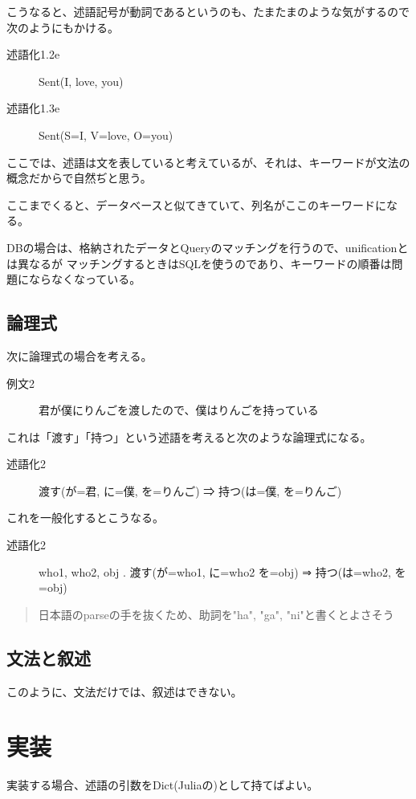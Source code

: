 \documentclass[10pt, oneside]{jarticle}   	%
\begin{document}
こうなると、述語記号が動詞であるというのも、たまたまのような気がするので次のようにもかける。

\begin{description}
\item[ 述語化1.2e] Sent(I, love, you)
\item[ 述語化1.3e] Sent(S=I, V=love, O=you)
\end{description}
ここでは、述語は文を表していると考えているが、それは、キーワードが文法の概念だからで自然ぢと思う。

ここまでくると、データベースと似てきていて、列名がここのキーワードになる。

DBの場合は、格納されたデータとQueryのマッチングを行うので、unificationとは異なるが
マッチングするときはSQLを使うのであり、キーワードの順番は問題にならなくなっている。



\subsection{論理式}
次に論理式の場合を考える。
\begin{description}
\item[ 例文2] 君が僕にりんごを渡したので、僕はりんごを持っている
\end{description}
これは「渡す」「持つ」という述語を考えると次のような論理式になる。
\begin{description}
\item[ 述語化2] 渡す(が=君, に=僕, を=りんご) ⇒ 持つ(は=僕, を=りんご)
\end{description}

これを一般化するとこうなる。
\begin{description}
\item[ 述語化2] who1, who2, obj . 渡す(が=who1, に=who2 を=obj) ⇒ 持つ(は=who2, を=obj)
\end{description}

\begin{quotation}
日本語のparseの手を抜くため、助詞を"ha", "ga", "ni"と書くとよさそう
\end{quotation}

\subsection{文法と叙述}
このように、文法だけでは、叙述はできない。


\section{実装}
実装する場合、述語の引数をDict(Juliaの)として持てばよい。
\end{document}

